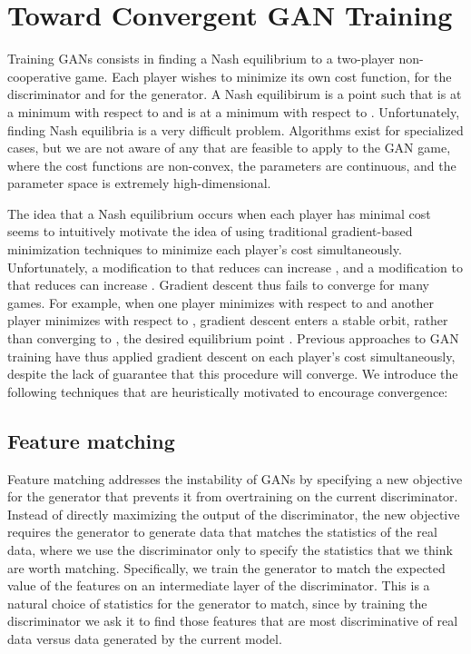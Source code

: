 \documentclass{article} \usepackage{nips14submit_e,times}
\begin{document}
\section{Toward Convergent GAN Training}
Training GANs consists in finding a Nash equilibrium to a two-player non-cooperative game.
Each player wishes to minimize its own cost function, 
for the discriminator
and  for the generator.
A Nash equilibirum is a point  such that  is
at a minimum with respect to  and  is at a minimum with respect to .
Unfortunately, finding Nash equilibria is a very difficult problem. Algorithms exist for specialized cases, but we are not aware of any that are feasible
to apply to the GAN game, where the cost functions are non-convex, the parameters are
continuous, and the parameter space is extremely high-dimensional.

The idea that a Nash equilibrium occurs when each player has minimal cost seems
to intuitively motivate the idea of using traditional gradient-based minimization
techniques to minimize each player's cost simultaneously.
Unfortunately, a modification to  that reduces  can increase
, and a modification to  that reduces  can increase
.
Gradient descent thus fails to converge for many games.
For example, when one player minimizes  with respect to  and another player
minimizes  with respect to , gradient descent enters a stable orbit,
rather than converging to , the desired equilibrium point \cite{Goodfellow-et-al-2016-Book}.
Previous approaches to GAN training have thus applied gradient descent on each player's
cost simultaneously, despite the lack of guarantee that this procedure will converge.
We introduce the following techniques that are heuristically motivated to encourage
convergence:


























\subsection{Feature matching}
\label{sec:feature}
Feature matching addresses the instability of GANs
by specifying a new objective for the generator that prevents it from overtraining on the current discriminator. Instead of directly maximizing the output of the discriminator, the new objective requires the generator to generate data that matches the statistics of the real data, where we use the discriminator only to specify the statistics that we think are worth matching. Specifically, we train the generator to match the expected value of the features on an intermediate layer of the discriminator. This is a natural choice of statistics for the generator to match, since by training the discriminator we ask it to find those features that are most discriminative of real data versus data generated by the current model. 
\end{document}
